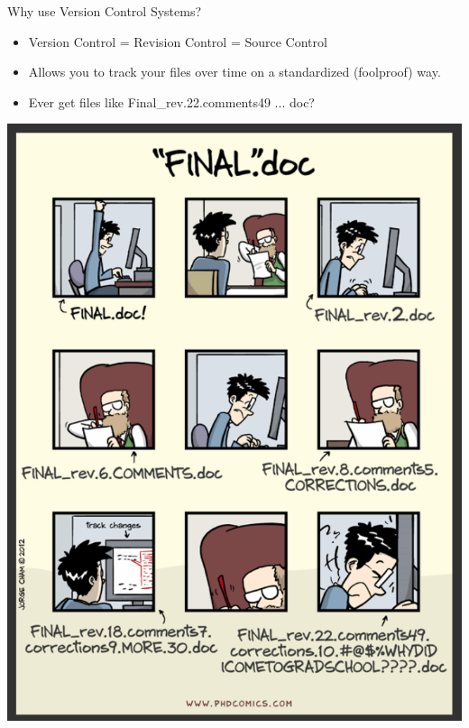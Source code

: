 \documentclass[10pt,xcolor=dvipsnames]{beamer}
\begin{document}
\begin{frame}{Why use Version Control Systems?}
\begin{itemize}
\item Version Control = Revision Control = Source Control
\item Allows you to track your files over time on a standardized (foolproof) way.
\item Ever get files like Final\_rev.22.comments49 ... doc?
\end{itemize}
\centering
    \includegraphics[height=0.6\textheight]{Finaldoc.png}
\end{frame}
\end{document}
